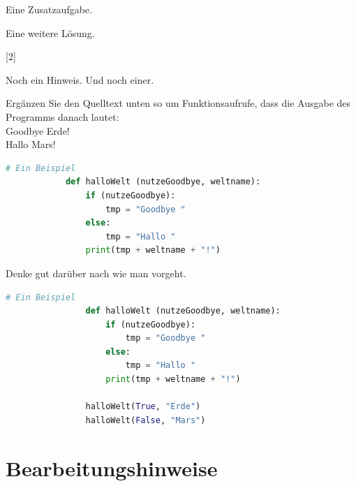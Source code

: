 \documentclass[a4paper]{scrartcl}
\begin{document}
    \begin{aufgabe*}
        Eine Zusatzaufgabe.
        \begin{loesung*}
            Eine weitere Lösung.
        \end{loesung*}
        [2]
        \begin{bearbeitungshinweis}
            Noch ein Hinweis. Und noch einer.
        \end{bearbeitungshinweis}
    \end{aufgabe*}

    \begin{aufgabe}
        Ergänzen Sie den Quelltext unten so um Funktionsaufrufe, dass die Ausgabe des Programms danach lautet:\\
        Goodbye Erde!\\
        Hallo Mars!
        \begin{lstlisting}[language=python,gobble=10]
            # Ein Beispiel
            def halloWelt (nutzeGoodbye, weltname):
                if (nutzeGoodbye):
                    tmp = "Goodbye "
                else:
                    tmp = "Hallo "
                print(tmp + weltname + "!")
        \end{lstlisting}
        \begin{bearbeitungshinweis}
            Denke gut darüber nach wie man vorgeht.
        \end{bearbeitungshinweis}
        \begin{loesung}
            \begin{lstlisting}[language=python,gobble=14]
                # Ein Beispiel
                def halloWelt (nutzeGoodbye, weltname):
                    if (nutzeGoodbye):
                        tmp = "Goodbye "
                    else:
                        tmp = "Hallo "
                    print(tmp + weltname + "!")

                halloWelt(True, "Erde")
                halloWelt(False, "Mars")
            \end{lstlisting}
        \end{loesung}
    \end{aufgabe}

\section*{Bearbeitungshinweise}
    \bearbeitungshinweisliste
\end{document}
